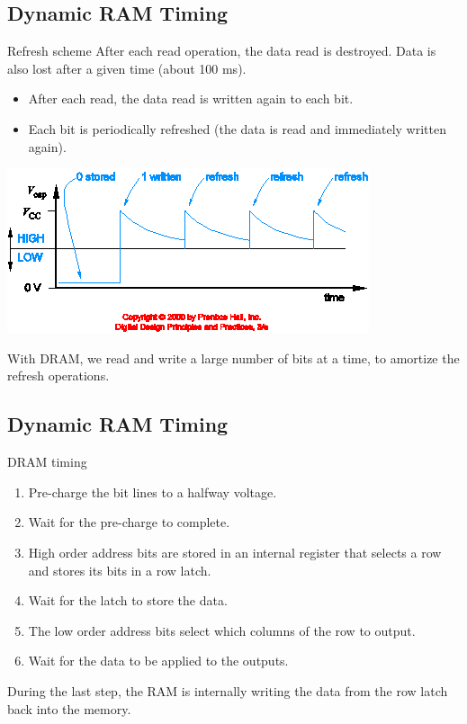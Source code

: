 \subsection{Dynamic RAM Timing}

\begin{frame}{Refresh scheme}
  After each read operation, the data read is destroyed.  Data is also lost after a given time (about 100 ms).
  \begin{itemize}
    \item After each read, the data read is written again to each bit.
    \item Each bit is periodically refreshed (the data is read and immediately written again).
  \end{itemize}
  \begin{center}
    \includegraphics[scale=0.3]{DRAMRefresh}
  \end{center}
  With DRAM, we read and write a large number of bits at a time, to amortize the refresh operations.
\end{frame}

\subsection{Dynamic RAM Timing}

\begin{frame}{DRAM timing}
  \begin{enumerate}
    \item Pre-charge the bit lines to a halfway voltage.
    \item Wait for the pre-charge to complete.
    \item High order address bits are stored in an internal register that selects a row and stores its bits in a row latch.
    \item Wait for the latch to store the data.
    \item The low order address bits select which columns of the row to output.
    \item Wait for the data to be applied to the outputs.
  \end{enumerate}
  During the last step, the RAM is internally writing the data from the row latch back into the memory.
\end{frame}

